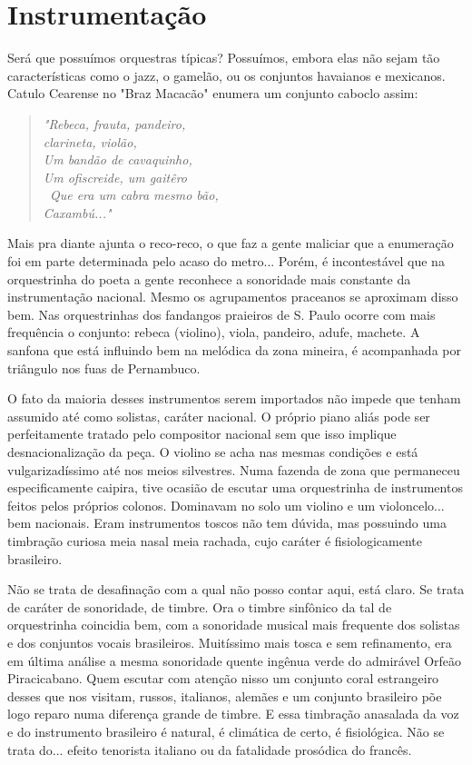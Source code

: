 \section{Instrumentação}

Será que possuímos orquestras típicas? Possuímos, embora elas não sejam
tão características como o jazz, o gamelão, ou os conjuntos havaianos e
mexicanos. Catulo Cearense no "Braz Macacão" enumera um conjunto caboclo
assim:

\begin{verse}
\emph{"Rebeca, frauta, pandeiro,}\\
\emph{clarineta, violão,}\\
\emph{Um bandão de cavaquinho,}\\
\emph{Um ofiscreide, um gaitêro}\\
\emph{~Que era um cabra mesmo bão,}\\
\emph{Caxambú..."}
\end{verse}

Mais pra diante ajunta o reco-reco, o que faz a gente maliciar que a
enumeração foi em parte determinada pelo acaso do metro... Porém, é
incontestável que na orquestrinha do poeta a gente reconhece a
sonoridade mais constante da instrumentação nacional. Mesmo os
agrupamentos praceanos se aproximam disso bem. Nas orquestrinhas dos
fandangos praieiros de S. Paulo ocorre com mais frequência o conjunto:
rebeca (violino), viola, pandeiro, adufe, machete. A sanfona que está
influindo bem na melódica da zona mineira, é acompanhada por triângulo
nos fuas de Pernambuco.

O fato da maioria desses instrumentos serem importados não impede que
tenham assumido até como solistas, caráter nacional. O próprio piano
aliás pode ser perfeitamente tratado pelo compositor nacional sem que
isso implique desnacionalização da peça. O violino se acha nas mesmas
condições e está vulgarizadíssimo até nos meios silvestres. Numa fazenda
de zona que permaneceu especificamente caipira, tive ocasião de escutar
uma orquestrinha de instrumentos feitos pelos próprios colonos.
Dominavam no solo um violino e um violoncelo... bem nacionais. Eram
instrumentos toscos não tem dúvida, mas possuindo uma timbração curiosa
meia nasal meia rachada, cujo caráter é fisiologicamente brasileiro.

Não se trata de desafinação com a qual não posso contar aqui, está
claro. Se trata de caráter de sonoridade, de timbre. Ora o timbre
sinfônico da tal de orquestrinha coincidia bem, com a sonoridade musical
mais frequente dos solistas e dos conjuntos vocais brasileiros.
Muitíssimo mais tosca e sem refinamento, era em última análise a mesma
sonoridade quente ingênua verde do admirável Orfeão Piracicabano. Quem
escutar com atenção nisso um conjunto coral estrangeiro desses que nos
visitam, russos, italianos, alemães e um conjunto brasileiro põe logo
reparo numa diferença grande de timbre. E essa timbração anasalada da
voz e do instrumento brasileiro é natural, é climática de certo, é
fisiológica. Não se trata do... efeito tenorista italiano ou da
fatalidade prosódica do francês.~

